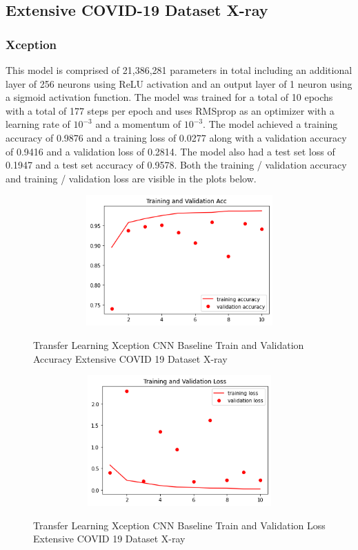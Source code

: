 \subsection{Extensive COVID-19 Dataset X-ray}
\subsubsection{Xception}
This model is comprised of 21,386,281 parameters in total including an additional layer of 256 neurons using ReLU activation and an output layer of 1 neuron using a sigmoid activation function.  The model was trained for a total of 10 epochs with a total of 177 steps per epoch and uses RMSprop as an optimizer with a learning rate of $10^{-3}$ and a momentum of $10^{-3}$.  The model achieved a training accuracy of 0.9876 and a training loss of 0.0277 along with a validation accuracy of 0.9416 and a validation loss of 0.2814.  The model also had a test set loss of 0.1947 and a test set accuracy of 0.9578. Both the training / validation accuracy and training / validation loss are visible in the plots below.
 \begin{figure}[H]
    \centering
    \includegraphics[width=1\textwidth,height=5cm,keepaspectratio]{Images/XceptionBaselineTrainingValidationAccuracyExtensiveXray.png}\\
    \caption{Transfer Learning Xception CNN Baseline Train and Validation Accuracy Extensive COVID 19 Dataset X-ray}
    \label{fig:Xception CNN Baseline Train and Validation Accuracy Extensive COVID 19 Dataset X-ray}
\end{figure}
 \begin{figure}[H]
    \centering
    \includegraphics[width=1\textwidth,height=5cm,keepaspectratio]{Images/XceptionBaselineTrainingValidationLossExtensiveCT.png}\\
    \caption{Transfer Learning Xception CNN Baseline Train and Validation Loss Extensive COVID 19 Dataset X-ray}
    \label{fig:Xception CNN Baseline Train and Validation Loss Extensive COVID 19 Dataset X-ray}
\end{figure}
